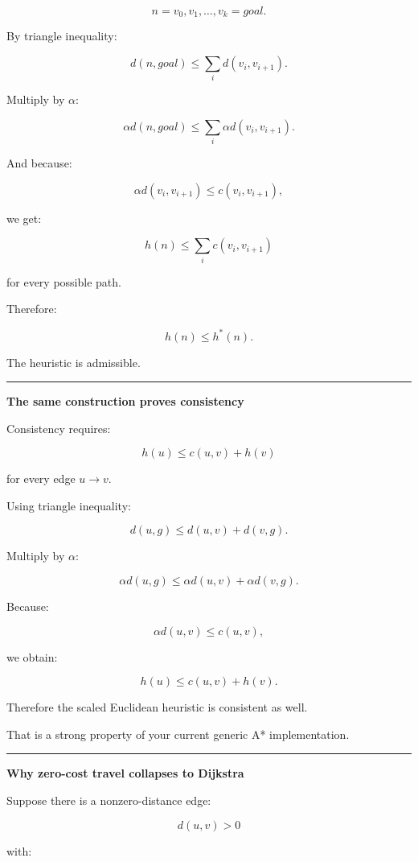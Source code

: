 \[
n=v_0,v_1,\dots,v_k=goal.
\]

By triangle inequality:

\[
d(n,goal)
\le
\sum_i d(v_i,v_{i+1}).
\]

Multiply by \(\alpha\):

\[
\alpha d(n,goal)
\le
\sum_i
\alpha d(v_i,v_{i+1}).
\]

And because:

\[
\alpha d(v_i,v_{i+1})
\le
c(v_i,v_{i+1}),
\]

we get:

\[
\boxed{
h(n)
\le
\sum_i c(v_i,v_{i+1})
}
\]

for every possible path.

Therefore:

\[
h(n)\le h^*(n).
\]

The heuristic is admissible.

\begin{center}\rule{0.5\linewidth}{0.5pt}\end{center}

\textbf{The same construction proves consistency}

Consistency requires:

\[
\boxed{
h(u)\le c(u,v)+h(v)
}
\]

for every edge \(u\rightarrow v\).

Using triangle inequality:

\[
d(u,g)
\le
d(u,v)+d(v,g).
\]

Multiply by \(\alpha\):

\[
\alpha d(u,g)
\le
\alpha d(u,v)
+
\alpha d(v,g).
\]

Because:

\[
\alpha d(u,v)
\le
c(u,v),
\]

we obtain:

\[
h(u)
\le
c(u,v)+h(v).
\]

Therefore the scaled Euclidean heuristic is consistent as well.

That is a strong property of your current generic A* implementation.

\begin{center}\rule{0.5\linewidth}{0.5pt}\end{center}

\textbf{Why zero-cost travel collapses to Dijkstra}

Suppose there is a nonzero-distance edge:

\[
d(u,v)>0
\]

with:

